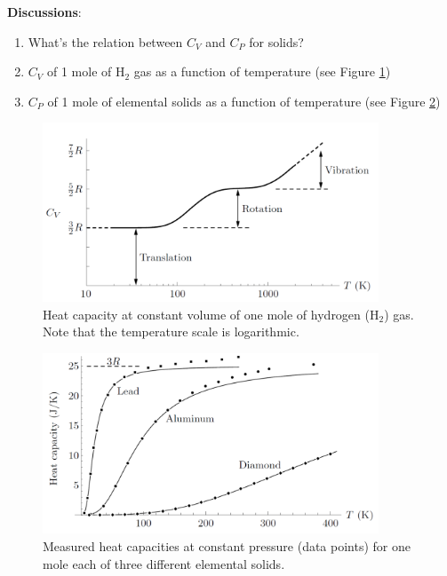 {\bf Discussions}: 
\begin{enumerate}
\item{What's the relation between $C_V$ and $C_P$ for solids?}
\item{$C_V$ of 1 mole of H$_2$ gas as a function of temperature (see Figure \ref{cv-h2})}
\item{$C_P$ of 1 mole of elemental solids as a function of temperature (see Figure \ref{cv-metal})}
\end{enumerate}

\begin{figure}[h]
\centering
\includegraphics[width=10cm]{imgs/Cv-hydrogen.png}
\caption{Heat capacity at constant volume of one mole of hydrogen (H$_2$) gas.
Note that the temperature scale is logarithmic. }
\label{cv-h2}
\end{figure}

\begin{figure}[h]
\centering
\includegraphics[width=10cm]{imgs/Cv-metal.png}
\caption{Measured heat capacities at constant pressure (data points) for
one mole each of three different elemental solids. }
\label{cv-metal}
\end{figure}

